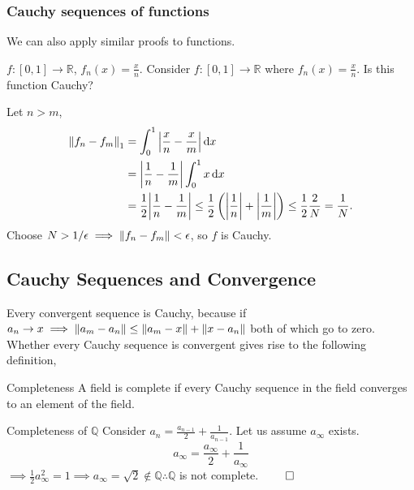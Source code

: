 \documentclass{book}
\begin{document}
\subsubsection{Cauchy sequences of functions}
We can also apply similar proofs to functions.
\begin{Examples}{$f:\left[0,1\right]\to \mathbb{R}$, $f_n(x) = \frac{x}{n}$.}{}
	Consider $f:\left[0,1\right]\to \mathbb{R}$ where $f_n(x) = \frac{x}{n}$. Is this function Cauchy?
\end{Examples}
Let $n > m$,
	\begin{equation}
		\begin{split}
		\norm{f_n - f_m}_1 & = \int_0^1 \abs{\frac{x}{n} - \frac{x}{m}}\dd{x} \\
		& = \abs{\frac{1}{n} - \frac{1}{m}}\int_0^1x \dd{x} \\
		& = \frac{1}{2}\abs{\frac{1}{n} - \frac{1}{m}}\leq \frac{1}{2}\left(\abs{\frac{1}{n}} + \abs{\frac{1}{m}}\right) \leq \frac{1}{2}\frac{2}{N} = \frac{1}{N}.
		\end{split}
	\end{equation}
	Choose $N > 1/\epsilon \implies \norm{f_n - f_m} < \epsilon$, so $f$ is Cauchy.

\subsection{Cauchy Sequences and Convergence}
Every convergent sequence is Cauchy, because if $a_n \to x \implies \norm{a_m - a_n} \leq \norm{a_m - x} + \norm{x - a_n}$ both of which go to zero. Whether every Cauchy sequence is convergent gives rise to the following definition,
\begin{Definitions}{Completeness}{}
	A field is complete if every Cauchy sequence in the field converges to an element of the field.
\end{Definitions}
\begin{Examples}{Completeness of $\mathbb{Q}$}{}
	Consider $a_n = \frac{a_{n-1}}{2} + \frac{1}{a_{n-1}}$. Let us assume $a_{\infty}$ exists.
	\begin{equation}
		a_{\infty} = \frac{a_{\infty}}{2} + \frac{1}{a_{\infty}}
	\end{equation}
	$\implies \frac{1}{2}a_{\infty}^2 = 1 \implies a_{\infty} = \sqrt{2} \notin \mathbb{Q} \therefore \mathbb{Q}$ is not complete. $\qed$ 
\end{Examples}
\end{document}
